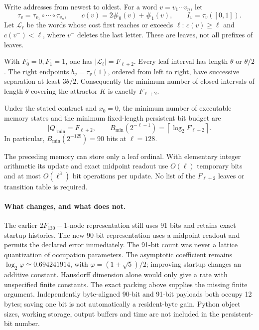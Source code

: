 Write addresses from newest to oldest. For a word $v=v_1\cdots v_n$, let
\[
 \tau_v=\tau_{v_1}\circ\cdots\circ\tau_{v_n},\qquad
 c(v)=2\#_0(v)+\#_1(v),\qquad I_v=\tau_v([0,1]).
\]
Let $\mathcal L_\ell$ be the words whose cost first reaches or exceeds
$\ell$: $c(v)\ge\ell$ and $c(v^-)<\ell$, where $v^-$ deletes the last
letter. These are leaves, not all prefixes of leaves.

\begin{lemma}
\label{III:M:lem:fibonacci-leaf-packing}
With $F_0=0,F_1=1$, one has $|\mathcal L_\ell|=F_{\ell+2}$.
Every leaf interval has length $\theta$ or $\theta/2$.
The right endpoints $b_v=\tau_v(1)$, ordered from left to right, have
successive separation at least $3\theta/2$.
Consequently the minimum number of closed intervals of length $\theta$
covering the attractor $K$ is exactly $F_{\ell+2}$.
\end{lemma}


\begin{theorem}
\label{III:M:thm:fibonacci-exact-optimum}
Under the stated contract and $x_0=0$, the minimum number of executable
memory states and the minimum fixed-length persistent bit budget are
\[
 |Q|_{\min}=F_{\ell+2},\qquad
 B_{\min}(2^{-\ell-1})=\left\lceil\log_2 F_{\ell+2}\right\rceil.
\]
In particular, $B_{\min}(2^{-129})=90$ bits at $\ell=128$.
\end{theorem}


\begin{proposition}
\label{III:M:prop:fibonacci-leaf-cost}
The preceding memory can store only a leaf ordinal. With elementary
integer arithmetic its update and exact midpoint readout use $O(\ell)$
temporary bits and at most $O(\ell^3)$ bit operations per update.
No list of the $F_{\ell+2}$ leaves or transition table is required.
\end{proposition}


\paragraph{What changes, and what does not.}
The earlier $2F_{130}-1$-node representation still uses 91 bits and
retains exact startup histories. The new 90-bit representation uses a
midpoint readout and permits the declared error immediately. The
91-bit count was never a lattice quantization of occupation parameters.
The asymptotic coefficient remains
$\log_2\varphi\simeq0.694241914$, with
$\varphi=(1+\sqrt5)/2$; improving startup changes an additive constant.
Hausdorff dimension alone would only give a rate with unspecified
finite constants. The exact packing above supplies the missing finite
argument. Independently byte-aligned 90-bit and 91-bit payloads both
occupy 12 bytes; saving one bit is not automatically a resident-byte gain.
Python object sizes, working storage, output buffers and time are not
included in the persistent-bit number.


